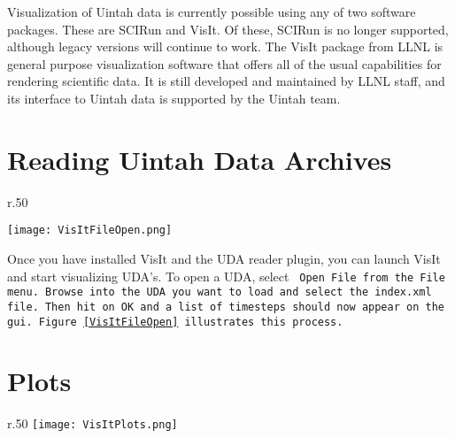 Visualization of Uintah data is currently possible using any of two
software packages.  These are SCIRun and VisIt.  Of these, SCIRun is
no longer supported, although legacy versions will continue to work.
The VisIt package from LLNL is general purpose visualization software
that offers all of the usual capabilities for rendering scientific
data.  It is still developed and maintained by LLNL staff, and its
interface to Uintah data is supported by the Uintah team.



\section{Reading Uintah Data Archives}

\begin{wrapfigure}{r}{.50\textwidth}
  \vspace{-30pt}
  \begin{center}
    \texttt{[image: VisItFileOpen.png]}
  \end{center}
  \vspace{-20pt}
  \caption{Opening an UDA with VisIt}
  \vspace{-10pt}
  \label{VisItFileOpen}
\end{wrapfigure}


Once you have installed VisIt and the UDA reader plugin, you can
launch VisIt and start visualizing UDA's. To open a UDA, select \tt
Open File \normalfont from the \tt File \normalfont menu. Browse into
the UDA you want to load and select the \tt index.xml \normalfont
file. Then hit on \tt OK \normalfont and a list of timesteps should
now appear on the gui. Figure~\ref{VisItFileOpen} illustrates this
process.


\section{Plots}

\begin{wrapfigure}{r}{.50\textwidth}
  \vspace{-65pt}
  \center
  \texttt{[image: VisItPlots.png]}
  \vspace{-10pt}
  \caption{Various plots in VisIt}
  \vspace{-50pt}
  \label{VisItPlots}
\end{wrapfigure}


